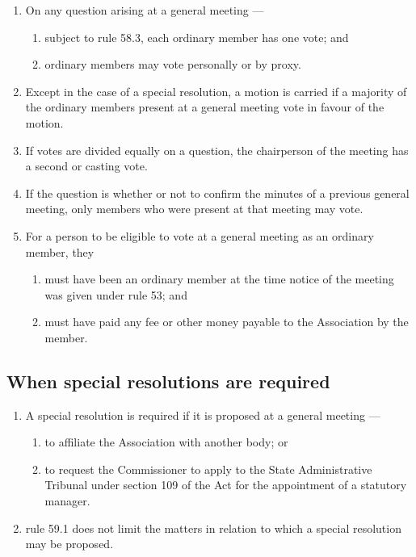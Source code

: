 \documentclass[../constitution.tex]{subfiles}
\begin{document}
\begin{enumerate}

\item On any question arising at a general meeting ---

  \begin{enumerate}
  
  \item subject to rule 58.3, each ordinary member has one vote; and
  \item ordinary members may vote personally or by proxy.
  \end{enumerate}
\item Except in the case of a special resolution, a motion is carried if a majority of the ordinary members present at a general meeting vote in favour of the motion.
\item If votes are divided equally on a question, the chairperson of the meeting has a second or casting vote.
\item If the question is whether or not to confirm the minutes of a previous general meeting, only members who were present at that meeting may vote.
\item For a person to be eligible to vote at a general meeting as an ordinary member, they

  \begin{enumerate}
  
  \item must have been an ordinary member at the time notice of the meeting was given under rule 53; and
  \item must have paid any fee or other money payable to the Association by the member.
  \end{enumerate}
\end{enumerate}

\hypertarget{when-special-resolutions-are-required}{%
\subsection{When special resolutions are required}\label{when-special-resolutions-are-required}}

\begin{enumerate}

\item A special resolution is required if it is proposed at a general meeting ---

  \begin{enumerate}
  
  \item to affiliate the Association with another body; or
  \item to request the Commissioner to apply to the State Administrative Tribunal under section 109 of the Act for the appointment of a statutory manager.
  \end{enumerate}
\item rule 59.1 does not limit the matters in relation to which a special resolution may be proposed.
\end{enumerate}
\end{document}
